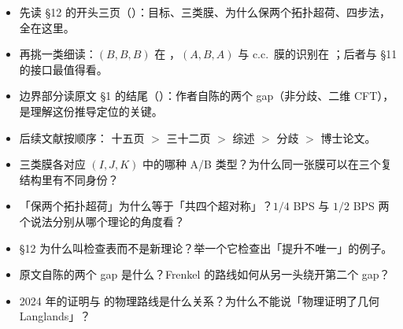 \begin{follow}
\begin{itemize}
\item 先读 \S12 的开头三页（）：目标、三类膜、为什么保两个拓扑超荷、四步法，全在这里。
\item 再挑一类细读：$(B,B,B)$ 在 ，$(A,B,A)$ 与 c.c.\ 膜的识别在 ；后者与 \S11 的接口最值得看。
\item 边界部分读原文 \S1 的结尾（）：作者自陈的两个 gap（非分歧、二维 CFT），是理解这份推导定位的关键。
\item 后续文献按顺序：\cite{w08} 十五页 $>$ \cite{fr09} 三十二页 $>$ \cite{bz04} 综述 $>$ \cite{gw06} 分歧 $>$ \cite{set13} 博士论文。
\end{itemize}
\end{follow}

\begin{checkbox}
\begin{itemize}
\item 三类膜各对应 $(I,J,K)$ 中的哪种 A/B 类型？为什么同一张膜可以在三个复结构里有不同身份？
\item 「保两个拓扑超荷」为什么等于「共四个超对称」？$1/4$ BPS 与 $1/2$ BPS 两个说法分别从哪个理论的角度看？
\item \S12 为什么叫检查表而不是新理论？举一个它检查出「提升不唯一」的例子。
\item 原文自陈的两个 gap 是什么？Frenkel 的路线如何从另一头绕开第二个 gap？
\item 2024 年的证明与 \kw{} 的物理路线是什么关系？为什么不能说「物理证明了几何 Langlands」？
\end{itemize}
\end{checkbox}
